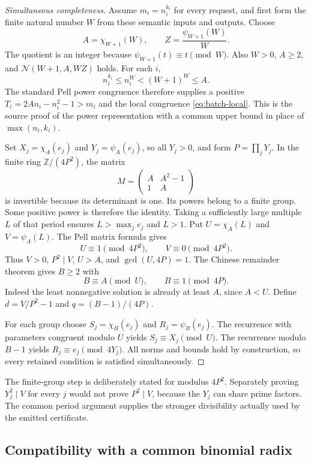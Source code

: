 \begin{proof}[Simultaneous completeness]
Assume $m_i=n_i^{k_i}$ for every request, and first form the finite natural
number $W$ from these semantic inputs and outputs. Choose
\[
 A=\chi_{W+1}(W),\qquad
 Z=\frac{\psi_{W+1}(W)}{W}.
\]
The quotient is an integer because
$\psi_{W+1}(t)\equiv t\pmod W$. Also $W>0$, $A\geq2$, and
$\mathcal N(W+1,A,WZ)$ holds. For each $i$,
\[
 n_i^{k_i}\leq n_i^W<(W+1)^W\leq A.
\]
The standard Pell power congruence therefore supplies a positive
$T_i=2An_i-n_i^2-1>m_i$ and the local congruence
\eqref{eq:batch-local}. This is the source proof of the power
representation with a common upper bound in place of $\max(n_i,k_i)$.

Set $X_j=\chi_A(e_j)$ and $Y_j=\psi_A(e_j)$, so all $Y_j>0$, and form
$P=\prod_jY_j$. In the finite ring $\mathbb Z/(4P^2)$, the matrix
\[
 M=\begin{pmatrix}A&A^2-1\\1&A\end{pmatrix}
\]
is invertible because its determinant is one. Its powers belong to a
finite group. Some positive power is therefore the identity. Taking a
sufficiently large multiple $L$ of that period ensures $L>\max_j e_j$
and $L>1$. Put $U=\chi_A(L)$ and $V=\psi_A(L)$. The Pell matrix formula
gives
\[
 U\equiv1\pmod{4P^2},\qquad V\equiv0\pmod{4P^2}.
\]
Thus $V>0$, $P^2\mid V$, $U>A$, and $\gcd(U,4P)=1$.
The Chinese remainder theorem gives $B\geq2$ with
\[
 B\equiv A\pmod U,\qquad B\equiv1\pmod{4P}.
\]
Indeed the least nonnegative solution is already at least $A$, since
$A<U$. Define $d=V/P^2-1$ and $q=(B-1)/(4P)$.

For each group choose $S_j=\chi_B(e_j)$ and $R_j=\psi_B(e_j)$.
The recurrence with parameters congruent modulo $U$ yields
$S_j\equiv X_j\pmod U$. The recurrence modulo $B-1$ yields
$R_j\equiv e_j\pmod{4Y_j}$. All norms and bounds hold by construction,
so every retained condition is satisfied simultaneously.
\end{proof}

The finite-group step is deliberately stated for modulus $4P^2$.
Separately proving $Y_j^2\mid V$ for every $j$ would not prove
$P^2\mid V$, because the $Y_j$ can share prime factors. The common
period argument supplies the stronger divisibility actually used by the
emitted certificate.

\subsection{Compatibility with a common binomial radix}

